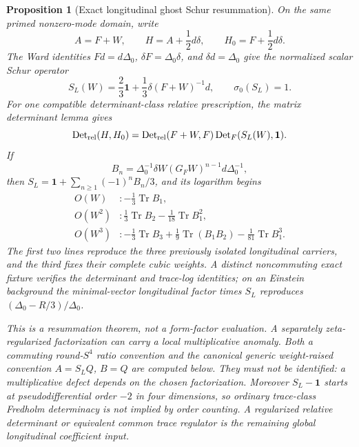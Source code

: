 \documentclass[11pt]{article}
\newtheorem{proposition}[theorem]{Proposition}
\theoremstyle{definition}
\theoremstyle{remark}
\begin{document}
\begin{proposition}[Exact longitudinal ghost Schur resummation]
On the same primed nonzero-mode domain, write
\[
 A=F+W,\qquad H=A+\frac12d\delta,
 \qquad H_0=F+\frac12d\delta .
\]
The Ward identities $Fd=d\Delta_0$, $\delta F=\Delta_0\delta$, and
$\delta d=\Delta_0$ give the normalized scalar Schur operator
\[
 S_L(W)=\frac23\mathbf1+\frac13\delta(F+W)^{-1}d,
 \qquad \sigma_0(S_L)=1.
\]
For one compatible determinant-class relative prescription, the matrix
determinant lemma gives
\[
 \operatorname{Det}_{\rm rel}(H,H_0)
 =\operatorname{Det}_{\rm rel}(F+W,F)
  \operatorname{Det}_{F}(S_L(W),\mathbf1).
\]
If
\[
 B_n=\Delta_0^{-1}\delta W(G_FW)^{n-1}d\Delta_0^{-1},
\]
then $S_L=\mathbf1+\sum_{n\geq1}(-1)^nB_n/3$, and its logarithm begins
\begin{align*}
 O(W)&:-\frac13\operatorname{Tr}B_1,\\
 O(W^2)&:\frac13\operatorname{Tr}B_2
          -\frac1{18}\operatorname{Tr}B_1^2,\\
 O(W^3)&:-\frac13\operatorname{Tr}B_3
          +\frac19\operatorname{Tr}(B_1B_2)
          -\frac1{81}\operatorname{Tr}B_1^3.
\end{align*}
The first two lines reproduce the three previously isolated longitudinal
carriers, and the third fixes their complete cubic weights.  A distinct
noncommuting exact fixture verifies the determinant and trace-log identities;
on an Einstein background the minimal-vector longitudinal factor times
$S_L$ reproduces $(\Delta_0-R/3)/\Delta_0$.

This is a resummation theorem, not a form-factor evaluation.  A separately
zeta-regularized factorization can carry a local multiplicative anomaly.
Both a commuting round-$S^4$ ratio convention and the canonical generic
weight-raised convention $A=S_LQ$, $B=Q$ are computed below.  They must not be
identified: a multiplicative defect depends on the chosen factorization.
Moreover $S_L-\mathbf1$ starts at
pseudodifferential order $-2$ in four dimensions, so ordinary trace-class
Fredholm determinacy is not implied by order counting.  A regularized
relative determinant or equivalent common trace regulator is the remaining
global longitudinal coefficient input.
\end{proposition}
\end{document}
